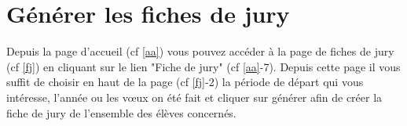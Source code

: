 \section{Générer les fiches de jury}
\label{fju}
Depuis la page d'accueil (cf \ref{aa}) vous pouvez accéder à la page de fiches de jury (cf \ref{fj}) en cliquant sur le lien "Fiche de jury" (cf \ref{aa}-7). Depuis cette page il vous suffit de choisir en haut de la page (cf \ref{fj}-2) la période de départ qui vous intéresse, l'année ou les vœux on été fait et cliquer sur générer afin de créer la fiche de jury de l'ensemble des élèves concernés. 


